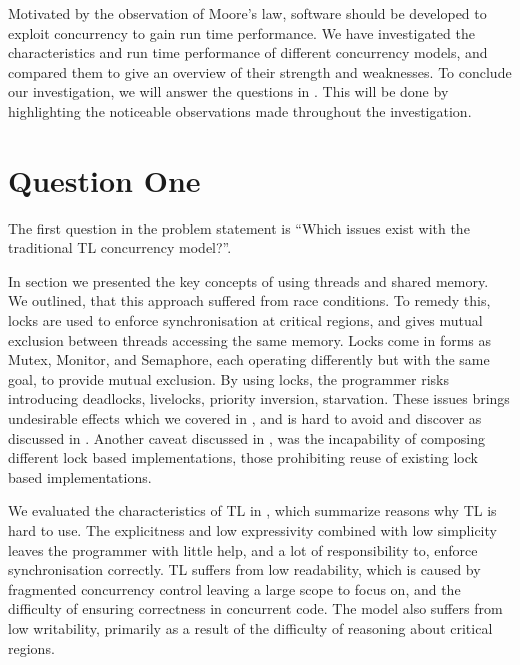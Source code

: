 \makeatletter {}\makeatother
{}
%
Motivated by the observation of Moore's law, software should be developed to exploit concurrency to gain run time performance. We have investigated the characteristics and run time performance of different concurrency models, and compared them to give an overview of their strength and weaknesses. To conclude our investigation, we will answer the questions in . This will be done by highlighting the noticeable observations made throughout the investigation.
\label{chap:conclusion}
\section{Question One}\label{sec:q_one}
The first question in the problem statement is ``Which issues exist with the traditional \ac{TL} concurrency model?''. 


In section  we presented the key concepts of using threads and shared memory. We outlined, that this approach suffered from race conditions. To remedy this, locks are used to enforce synchronisation at critical regions, and gives mutual exclusion between threads accessing the same memory. Locks come in forms as Mutex, Monitor, and Semaphore, each operating differently but with the same goal, to provide mutual exclusion. By using locks, the programmer risks introducing deadlocks, livelocks, priority inversion, starvation. These issues brings undesirable effects which we covered in , and is hard to avoid and discover as discussed in . Another caveat discussed in , was the incapability of composing different lock based implementations, those prohibiting reuse of existing lock based implementations. 

We evaluated the characteristics of \ac{TL} in , which summarize reasons why \ac{TL} is hard to use. The explicitness and low expressivity combined with low simplicity leaves the programmer with little help, and a lot of responsibility to, enforce synchronisation correctly. \ac{TL} suffers from low readability, which is caused by fragmented concurrency control leaving a large scope to focus on, and the difficulty of ensuring correctness in concurrent code. The model also suffers from low writability, primarily as a result of the difficulty of reasoning about critical regions.

